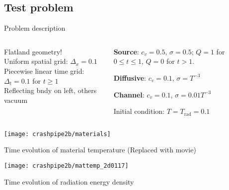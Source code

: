 \documentclass{beamer}
\begin{document}
\subsection{Test problem}
\begin{frame}{Problem description}
  \begin{columns}[t]
    \begin{column}{.48\textwidth}
      Flatland geometry!
      \\Uniform spatial grid: $\Delta_x=0.1$
      \\Piecewise linear time grid: $\Delta_t=0.1$ for $t \ge 1$
      \\Reflecting bndy on left, others vacuum
    \end{column}
    \begin{column}{.48\textwidth}
      \textcolor[rgb]{0,0,1}{\textbf{Source}}: $c_v=0.5$, $\sigma=0.5$;
      $Q=1$ for $0 \le t \le 1$, $Q=0$ for $t > 1$.

      \textcolor[rgb]{1,0,0}{\textbf{Diffusive}}: $c_v=0.1$,
      $\sigma=T^{-3}$

      \textcolor[rgb]{0.1,0.9,0.1}{\textbf{Channel}}: $c_v=0.1$,
      $\sigma=0.01 T^{-3}$

      Initial condition: $T=T_\text{rad}=0.1$
    \end{column}
  \end{columns}
\begin{center}
  \texttt{[image: crashpipe2b/materials]}
\end{center}
\end{frame}

\begin{frame}{Time evolution of material temperature}
  \centering
  \tiny (Replaced with movie)
  \par
  \texttt{[image: crashpipe2b/mattemp\_2d0117]}
  \par
\end{frame}
\begin{frame}{Time evolution of radiation energy density}

\centering
\hspace{-1in}%
%
\only<2>{}%
\only<3>{}%
\only<4>{}%
%
\hspace{-.35in}
%
%
%
%
%
\hspace{-1in}
\par
  
\vspace{-\baselineskip}\small
{}%
%
%
%
%
\end{frame}
\end{document}
